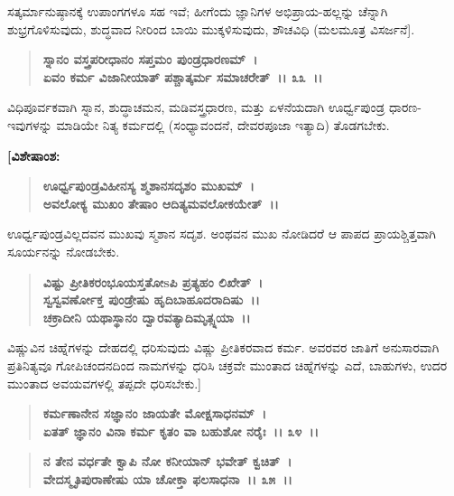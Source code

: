 ಸತ್ಕರ್ಮಾನುಷ್ಠಾನಕ್ಕೆ ಉಪಾಂಗಗಳೂ ಸಹ ಇವೆ; ಹೀಗೆಂದು ಜ್ಞಾನಿಗಳ ಅಭಿಪ್ರಾಯ-\-ಹಲ್ಲನ್ನು ಚೆನ್ನಾಗಿ ಶುಭ್ರಗೊಳಿಸುವುದು, ಶುದ್ಧವಾದ ನೀರಿಂದ ಬಾಯಿ ಮುಕ್ಕಳಿಸುವುದು, ಶೌಚವಿಧಿ (ಮಲಮೂತ್ರ ವಿಸರ್ಜನೆ].

\begin{verse}
\textbf{ಸ್ನಾನಂ ವಸ್ತ್ರಪರೀಧಾನಂ ಸಪ್ತಮಂ ಪುಂಡ್ರಧಾರಣಮ್~।}\\\textbf{ಏವಂ ಕರ್ಮ ವಿಜಾನೀಯಾತ್ ಪಶ್ಚಾತ್ಕರ್ಮ ಸಮಾಚರೇತ್~।। ೩೩~।।}
\end{verse}

ವಿಧಿಪೂರ್ವಕವಾಗಿ ಸ್ನಾನ, ಶುದ್ಧಾಚಮನ, ಮಡಿವಸ್ತ್ರಧಾರಣ, ಮತ್ತು ಏಳನೆಯದಾಗಿ ಊರ್ಧ್ವಪುಂಡ್ರ ಧಾರಣ-ಇವುಗಳನ್ನು ಮಾಡಿಯೇ ನಿತ್ಯ ಕರ್ಮದಲ್ಲಿ (ಸಂಧ್ಯಾವಂದನೆ, ದೇವರ\-ಪೂಜಾ ಇತ್ಯಾದಿ) ತೊಡಗಬೇಕು.

\begin{flushleft}
\textbf{[ವಿಶೇಷಾಂಶ:}
\end{flushleft}

\begin{verse}
\textbf{ಊರ್ಧ್ವಪುಂಡ್ರವಿಹೀನಸ್ಯ ಶ್ಮಶಾನಸದೃಶಂ ಮುಖಮ್~।}\\\textbf{ಅವಲೋಕ್ಯ ಮುಖಂ ತೇಷಾಂ ಆದಿತ್ಯಮವಲೋಕಯೇತ್~।।}
\end{verse}

ಊರ್ಧ್ವಪುಂಡ್ರವಿಲ್ಲದವನ ಮುಖವು ಸ್ಮಶಾನ ಸದೃಶ. ಅಂಥವನ ಮುಖ ನೋಡಿದರೆ ಆ ಪಾಪದ ಪ್ರಾಯಶ್ಚಿತ್ತವಾಗಿ ಸೂರ್ಯನನ್ನು ನೋಡಬೇಕು.

\begin{verse}
\textbf{ವಿಷ್ಟು ಪ್ರೀತಿಕರಂಭೂಯಸ್ತತೋsಪಿ ಪ್ರತ್ಯಹಂ ಲಿಖೇತ್~।}\\\textbf{ಸ್ವಸ್ವವರ್ಣೋಕ್ತ ಪುಂಡ್ರೇಷು ಹೃದಿಬಾಹೂದರಾದಿಷು~।। }\\\textbf{ಚಕ್ರಾದೀನಿ ಯಥಾಸ್ಥಾನಂ ದ್ವಾರವತ್ಯಾದಿಮೃತ್ಸ್ನಯಾ~।।} 
\end{verse}

ವಿಷ್ಣುವಿನ ಚಿಹ್ನೆಗಳನ್ನು ದೇಹದಲ್ಲಿ ಧರಿಸುವುದು ವಿಷ್ಣು ಪ್ರೀತಿಕರವಾದ ಕರ್ಮ. ಅವರವರ ಜಾತಿಗೆ ಅನುಸಾರವಾಗಿ ಪ್ರತಿನಿತ್ಯವೂ ಗೋಪಿಚಂದನದಿಂದ ನಾಮಗಳನ್ನು ಧರಿಸಿ ಚಕ್ರವೇ ಮುಂತಾದ ಚಿಹ್ನೆಗಳನ್ನು ಎದೆ, ಬಾಹುಗಳು, ಉದರ ಮುಂತಾದ ಅವಯವಗಳಲ್ಲಿ ತಪ್ಪದೇ ಧರಿಸಬೇಕು.]

\begin{verse}
\textbf{ಕರ್ಮಣಾನೇನ ಸಜ್ಞಾನಂ ಜಾಯತೇ ಮೋಕ್ಷಸಾಧನಮ್~।}\\\textbf{ಏತತ್ ಜ್ಞಾನಂ ವಿನಾ ಕರ್ಮ ಕೃತಂ ವಾ ಬಹುಶೋ ನರೈಃ~।। ೩೪~।। }
\end{verse}

\begin{verse}
\textbf{ನ ತೇನ ವರ್ಧತೇ ಕ್ವಾಪಿ ನೋ ಕನೀಯಾನ್ ಭವೇತ್ ಕ್ವಚಿತ್~।}\\\textbf{ವೇದಸ್ಮೃತಿಪುರಾಣೇಷು ಯಾ ಚೋಕ್ತಾ ಫಲಸಾಧನಾ~।। ೩೫~।।}
\end{verse}

